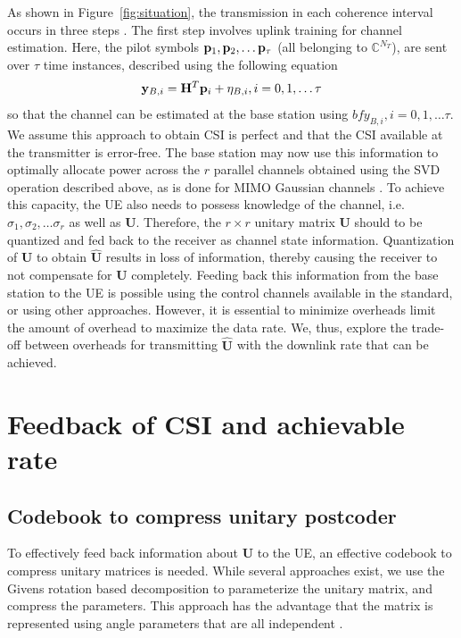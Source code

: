 \documentclass[conference]{IEEEtran}
\def\bH{\mathbf{H}}
\def\bU{\mathbf{U}}
\def\by{\mathbf{y}}
\begin{document}
As shown in Figure~\ref{fig:situation}, the transmission in each
coherence interval occurs in three steps
\cite{larsson2014massive}. The first step involves uplink training
for channel estimation. Here, the pilot symbols
${\bf p}_1, {\bf p}_2, \ldots {\bf p}_{\tau}$ (all belonging to
$\mathbb{C}^{N_T}$), are sent over $\tau$ time instances, described
using the following equation
\begin{equation}
{\by}_{B,i} = \bH^T {\bf p}_i + \eta_{B,i}, i = 0, 1, \ldots \tau
\end{equation}
so that the channel can be estimated at the base station using
${bf y}_{B,i}, i = 0, 1, \ldots \tau$. We assume this approach to
obtain CSI is perfect and that the CSI available at the transmitter is
error-free. The base station may now use this information to optimally
allocate power across the $r$ parallel channels obtained using the SVD
operation described above, as is done for MIMO Gaussian channels
\cite{telatar1999capacity}. To achieve this capacity, the UE also
needs to possess knowledge of the channel, i.e.
$\sigma_1, \sigma_2, \ldots \sigma_r$ as well as $\bU$. Therefore, the
$r\times r$ unitary matrix $\bU$ should to be quantized and fed back
to the receiver as channel state information. Quantization of $\bU$ to
obtain $\hat{\bU}$ results in loss of information, thereby causing the
receiver to not compensate for $\bU$ completely. Feeding back this
information from the base station to the UE is possible using the
control channels available in the standard, or using other
approaches. However, it is essential to minimize overheads limit the
amount of overhead to maximize the data rate. We, thus, explore the
trade-off between overheads for transmitting $\hat{\bU}$ with the
downlink rate that can be achieved.

\section{Feedback of CSI and achievable rate}
\subsection{Codebook to compress unitary postcoder}
To effectively feed back information about $\bU$ to the UE, an
effective codebook to compress unitary matrices is needed. While
several approaches exist, we use the Givens rotation based
decomposition to parameterize the unitary matrix, and compress the
parameters. This approach has the advantage that the matrix is
represented using angle parameters that are all independent
\cite{roh2007efficient}.
\end{document}
